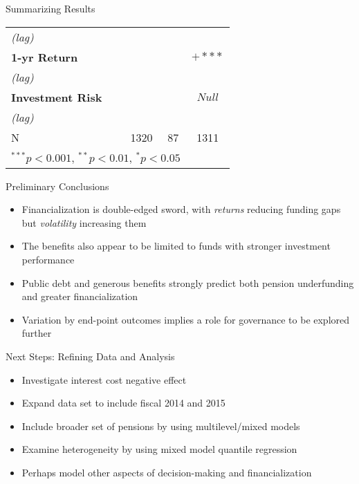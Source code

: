 \documentclass{beamer}
\begin{document}
\begin{frame}{\textmd{Summarizing Results}}
\begin{table}
\begin{tiny}
\begin{center}
\begin{tabular}{l c c c}
\hspace*{0.25cm} \emph{(lag)}&  &   \\[0.4ex]
\textbf{1-yr Return} & &  & \scriptsize{\color{teal}\textbf{$+***$}}   \\
\hspace*{0.25cm} \emph{(lag)} &  &  \\[0.4ex]
\textbf{Investment Risk}  & &  & \color{gray}$Null$ \\
\hspace*{0.25cm} \emph{(lag)}&  &  \\[0.2ex]
\hline
N & 1320 & 87 & 1311 \\
\hline
\multicolumn{3}{l}{$^{***}p<0.001$, $^{**}p<0.01$, $^*p<0.05$}
\end{tabular}
\end{center}
\end{tiny}
\end{table}
\end{frame}


\begin{frame}{\textmd{Preliminary Conclusions}}
\begin{itemize}
	\item Financialization is double-edged sword, with \emph{returns} reducing funding gaps but \emph{volatility} increasing them 
	\item The benefits also appear to be limited to funds with stronger investment performance
	\item Public debt and generous benefits strongly predict both pension underfunding and greater financialization
	\item Variation by end-point outcomes implies a role for governance to be explored further
\end{itemize}

\end{frame}

\begin{frame}{\textmd{Next Steps: Refining Data and Analysis}}
\begin{itemize}
	\item Investigate interest cost negative effect
	\item Expand data set to include fiscal 2014 and 2015
	\item Include broader set of pensions by using multilevel/mixed models
	\item Examine heterogeneity by using mixed model quantile regression
	\item Perhaps model other aspects of decision-making and financialization
\end{itemize}

\end{frame}
\end{document}
